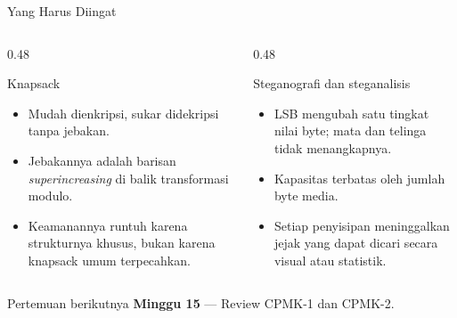 \documentclass[aspectratio=169,11pt]{beamer}
\begin{document}
\begin{frame}{Yang Harus Diingat}
    \begin{columns}[T,onlytextwidth]
        \begin{column}{0.48\textwidth}
            \begin{block}{Knapsack}
                \footnotesize
                \begin{itemize}
                    \item Mudah dienkripsi, sukar didekripsi tanpa jebakan.
                    \item Jebakannya adalah barisan \textit{superincreasing}
                          di balik transformasi modulo.
                    \item Keamanannya runtuh karena strukturnya khusus, bukan
                          karena knapsack umum terpecahkan.
                \end{itemize}
            \end{block}
        \end{column}
        \begin{column}{0.48\textwidth}
            \begin{block}{Steganografi dan steganalisis}
                \footnotesize
                \begin{itemize}
                    \item LSB mengubah satu tingkat nilai byte; mata dan
                          telinga tidak menangkapnya.
                    \item Kapasitas terbatas oleh jumlah byte media.
                    \item Setiap penyisipan meninggalkan jejak yang dapat
                          dicari secara visual atau statistik.
                \end{itemize}
            \end{block}
        \end{column}
    \end{columns}
    \vspace{0.15cm}
    \begin{exampleblock}{Pertemuan berikutnya}
        \textbf{Minggu 15} --- Review CPMK-1 dan CPMK-2.
    \end{exampleblock}
\end{frame}
\end{document}
